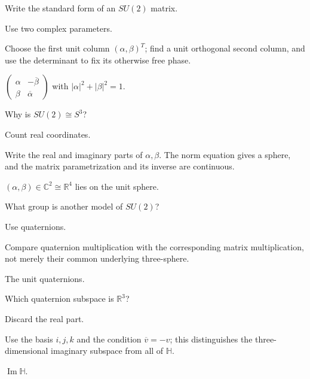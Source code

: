 \begin{exercise}\label{exr:viii13-02}
Write the standard form of an \(SU(2)\) matrix.
\end{exercise}
\begin{hint}
Use two complex parameters.

Choose the first unit column \((\alpha,\beta)^T\); find a unit orthogonal second column, and use the determinant to fix its otherwise free phase.
\end{hint}
\begin{solution}
\(\begin{pmatrix}\alpha&-\overline\beta\\ \beta&\overline\alpha\end{pmatrix}\) with \(|\alpha|^2+|\beta|^2=1\).
\end{solution}

\begin{exercise}\label{exr:viii13-03}
Why is \(SU(2)\cong S^3\)?
\end{exercise}
\begin{hint}
Count real coordinates.

Write the real and imaginary parts of \(\alpha,\beta\). The norm equation gives a sphere, and the matrix parametrization and its inverse are continuous.
\end{hint}
\begin{solution}
\((\alpha,\beta)\in\mathbb C^2\cong\mathbb R^4\) lies on the unit sphere.
\end{solution}

\begin{exercise}\label{exr:viii13-04}
What group is another model of \(SU(2)\)?
\end{exercise}
\begin{hint}
Use quaternions.

Compare quaternion multiplication with the corresponding matrix multiplication, not merely their common underlying three-sphere.
\end{hint}
\begin{solution}
The unit quaternions.
\end{solution}

\begin{exercise}\label{exr:viii13-05}
Which quaternion subspace is \(\mathbb R^3\)?
\end{exercise}
\begin{hint}
Discard the real part.

Use the basis \(i,j,k\) and the condition \(\overline v=-v\); this distinguishes the three-dimensional imaginary subspace from all of \(\mathbb H\).
\end{hint}
\begin{solution}
\(\operatorname{Im}\mathbb H\).
\end{solution}

